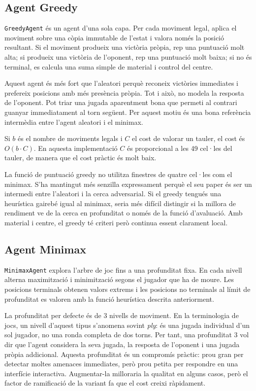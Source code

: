 \documentclass[conference,compsoc]{IEEEtran}
\begin{document}
\subsection{Agent Greedy}

\texttt{GreedyAgent} és un agent d'una sola capa. Per cada moviment legal, aplica
el moviment sobre una còpia immutable de l'estat i valora només la posició
resultant. Si el moviment produeix una victòria pròpia, rep una puntuació molt
alta; si produeix una victòria de l'oponent, rep una puntuació molt baixa; si no
és terminal, es calcula una suma simple de material i control del centre.

Aquest agent és més fort que l'aleatori perquè reconeix victòries immediates i
prefereix posicions amb més presència pròpia. Tot i això, no modela la resposta de
l'oponent. Pot triar una jugada aparentment bona que permeti al contrari guanyar
immediatament al torn següent. Per aquest motiu és una bona referència intermèdia
entre l'agent aleatori i el minimax.

Si $b$ és el nombre de moviments legals i $C$ el cost de valorar un tauler, el
cost és $O(b\cdot C)$. En aquesta implementació $C$ és proporcional a les 49
cel·les del tauler, de manera que el cost pràctic és molt baix.

La funció de puntuació greedy no utilitza finestres de quatre cel·les com el
minimax. S'ha mantingut més senzilla expressament perquè el seu paper és ser un
intermedi entre l'aleatori i la cerca adversarial. Si el greedy tengués una
heurística gairebé igual al minimax, seria més difícil distingir si la millora de
rendiment ve de la cerca en profunditat o només de la funció d'avaluació. Amb
material i centre, el greedy té criteri però continua essent clarament local.

\subsection{Agent Minimax}

\texttt{MinimaxAgent} explora l'arbre de joc fins a una profunditat fixa. En cada
nivell alterna maximització i minimització segons el jugador que ha de moure. Les
posicions terminals obtenen valors extrems i les posicions no terminals al límit
de profunditat es valoren amb la funció heurística descrita anteriorment.

La profunditat per defecte és de 3 nivells de moviment. En la terminologia de
jocs, un nivell d'aquest tipus s'anomena sovint \textit{ply}: és una jugada
individual d'un sol jugador, no una ronda completa de dos torns. Per tant, una
profunditat 3 vol dir que l'agent considera la seva jugada, la resposta de
l'oponent i una jugada pròpia addicional. Aquesta profunditat és un compromís
pràctic: prou gran per detectar moltes amenaces immediates, però prou petita per
respondre en una interfície interactiva. Augmentar-la milloraria la qualitat en
alguns casos, però el factor de ramificació de la variant fa que el cost creixi
ràpidament.
\end{document}
